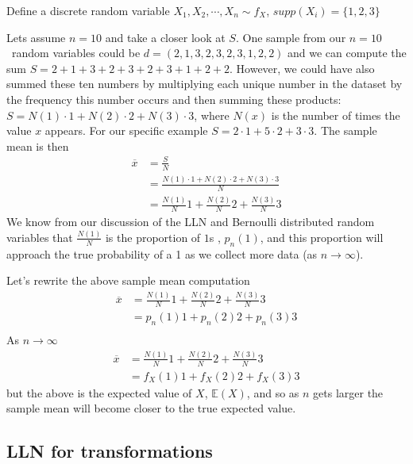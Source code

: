 \begin{VT1}

Define a discrete random variable $X_{1}, X_{2}, \cdots, X_{n} \sim f_{X}$, $supp(X_{i}) = \{1,2,3\}$

Lets assume $n=10$ and take a closer look at $S$.
One sample from our $n=10$\ random variables could be  $d = (2,1,3,2,3,2,3,1,2,2)$ and we can compute the sum $S = 2+1+3+2+3+2+3+1+2+2$. 
However, we could have also summed these ten numbers by multiplying each unique number in the dataset by the frequency this number occurs and then summing these products: $S = N(1) \cdot 1 + N(2) \cdot 2 + N(3) \cdot 3$, where $N(x)$ is the number of times the value $x$ appears.
For our specific example $S = 2 \cdot 1 + 5 \cdot 2 + 3 \cdot 3$.
The sample mean is then 
\begin{align}
    \overline{x} &= \frac{S}{N} \\ 
                 &= \frac{N(1) \cdot 1 + N(2) \cdot 2 + N(3) \cdot 3}{N}\\
                 &= \frac{N(1)}{N} 1 + \frac{N(2)}{N} 2  + \frac{N(3)}{N} 3 
\end{align}
We know from our discussion of the LLN and Bernoulli distributed random variables that $\frac{N(1)}{N}$ is the proportion of $1$s , $p_{n}(1)$, and this proportion will approach the true probability of a 1 as we collect more data (as $n \to \infty$).

Let's rewrite the above sample mean computation
\begin{align}
    \overline{x} &= \frac{N(1)}{N} 1 + \frac{N(2)}{N} 2  + \frac{N(3)}{N} 3 \\ 
                 &= p_{n}(1) 1 + p_{n}(2) 2  + p_{n}(3) 3 \\ 
\end{align}
As $n \to \infty$
\begin{align}
    \overline{x} &= \frac{N(1)}{N} 1 + \frac{N(2)}{N} 2  + \frac{N(3)}{N} 3 \\ 
                 &= f_{X}(1) 1 + f_{X}(2) 2  + f_{X}(3) 3
\end{align}
but the above is the expected value of $X$, $\mathbb{E}(X)$, and so as $n$ gets larger the sample mean will become closer to the true expected value.
\end{VT1}


\subsection{LLN for transformations}

